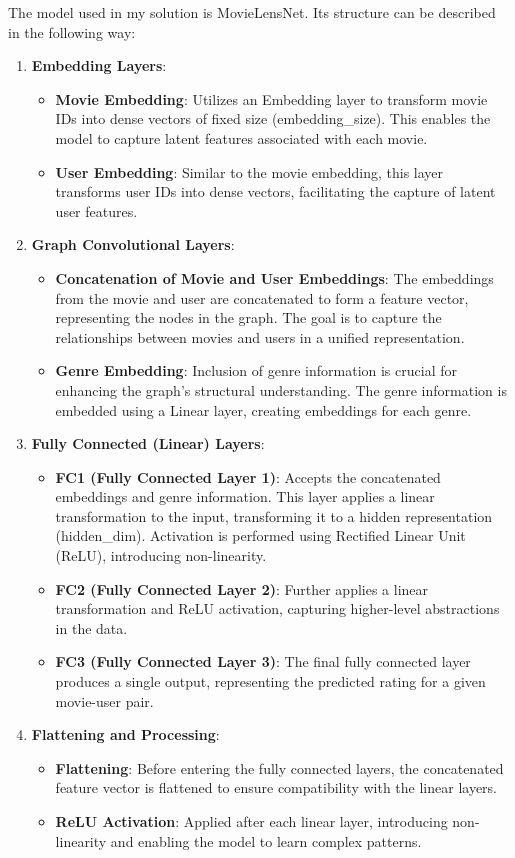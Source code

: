 \documentclass[]{article}
\begin{document}
	The model used in my solution is MovieLensNet. Its structure can be described in the following way:
	\begin{enumerate}
		\item \textbf{Embedding Layers}:
		\begin{itemize}
			\item \textbf{Movie Embedding}: Utilizes an Embedding layer to transform movie IDs into dense vectors of fixed size (embedding\_size). This enables the model to capture latent features associated with each movie.
			\item \textbf{User Embedding}: Similar to the movie embedding, this layer transforms user IDs into dense vectors, facilitating the capture of latent user features.
		\end{itemize}
		\item \textbf{Graph Convolutional Layers}:
		\begin{itemize}
			\item \textbf{Concatenation of Movie and User Embeddings}: The embeddings from the movie and user are concatenated to form a feature vector, representing the nodes in the graph. The goal is to capture the relationships between movies and users in a unified representation.
			\item \textbf{Genre Embedding}: Inclusion of genre information is crucial for enhancing the graph's structural understanding. The genre information is embedded using a Linear layer, creating embeddings for each genre.
		\end{itemize}
		\item \textbf{Fully Connected (Linear) Layers}:
		\begin{itemize}
			\item \textbf{FC1 (Fully Connected Layer 1)}: Accepts the concatenated embeddings and genre information. This layer applies a linear transformation to the input, transforming it to a hidden representation (hidden\_dim). Activation is performed using Rectified Linear Unit (ReLU), introducing non-linearity.
			\item \textbf{FC2 (Fully Connected Layer 2)}: Further applies a linear transformation and ReLU activation, capturing higher-level abstractions in the data.
			\item \textbf{FC3 (Fully Connected Layer 3)}: The final fully connected layer produces a single output, representing the predicted rating for a given movie-user pair.
		\end{itemize}
		\item \textbf{Flattening and Processing}:
		\begin{itemize}
			\item \textbf{Flattening}: Before entering the fully connected layers, the concatenated feature vector is flattened to ensure compatibility with the linear layers.
			\item \textbf{ReLU Activation}: Applied after each linear layer, introducing non-linearity and enabling the model to learn complex patterns.
		\end{itemize}
	\end{enumerate}
	
\end{document}
